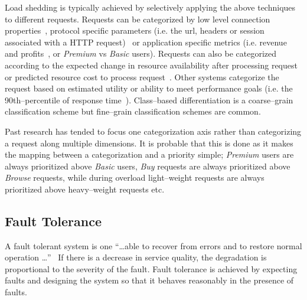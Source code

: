 \documentclass[conference]{IEEEtran}
\begin{document}
Load shedding is typically achieved by selectively applying the above techniques to different requests. Requests can be categorized by low level connection properties~\cite{Voigt:2001qe}, protocol specific parameters (i.e. the url, headers or session associated with a HTTP request)~\cite{Cherkasova:2002yb,Voigt:2001qe} or application specific metrics (i.e. revenue and profits~\cite{Menasec:2000ty}, or \emph{Premium} vs \emph{Basic} users). Requests can also be categorized according to the expected change in resource availability after processing request~\cite{Behren03Capriccio} or predicted resource cost to process request~\cite{Crovella99Alpha}. Other systems categorize the request based on estimated utility\cite{Zhou06RequestAware} or ability to meet performance goals (i.e. the 90th--percentile of response time~\cite{welsh03Adaptive}). Class--based differentiation is a coarse--grain classification scheme but fine--grain classification schemes are common.

Past research has tended to focus one categorization axis rather than categorizing a request along multiple dimensions. It is probable that this is done as it makes the mapping between a categorization and a priority simple; \emph{Premium} users are always prioritized above \emph{Basic} users, \emph{Buy} requests are always prioritized above \emph{Browse} requests, while during overload light--weight requests are always prioritized above heavy--weight requests etc. 

\subsection{Fault Tolerance}


A fault tolerant system is one ``\ldots able to recover from errors and to restore normal operation \ldots''~\cite{Renzel:03:ErrorHandling} If there is a decrease in service quality, the degradation is proportional to the severity of the fault. Fault tolerance is achieved by expecting faults and designing the system so that it behaves reasonably in the presence of faults.
\end{document}
